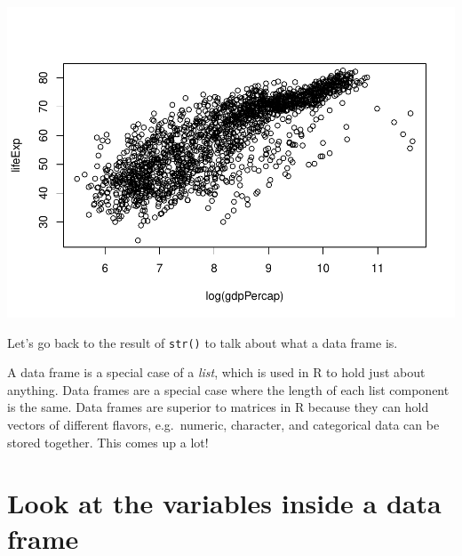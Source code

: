 \documentclass[
]{book}
\newenvironment{Shaded}{\begin{snugshade}}{\end{snugshade}}
\newcommand{\CommentTok}[1]{\textcolor[rgb]{0.56,0.35,0.01}{\textit{#1}}}
\newcommand{\KeywordTok}[1]{\textcolor[rgb]{0.13,0.29,0.53}{\textbf{#1}}}
\newcommand{\NormalTok}[1]{#1}
\begin{document}
\includegraphics{05_data-care-feeding_files/figure-latex/first-plots-base-R-3.pdf}

Let's go back to the result of \texttt{str()} to talk about what a data frame is.

\begin{Shaded}
\end{Shaded}

A data frame is a special case of a \emph{list}, which is used in R to hold just about anything. Data frames are a special case where the length of each list component is the same. Data frames are superior to matrices in R because they can hold vectors of different flavors, e.g.~numeric, character, and categorical data can be stored together. This comes up a lot!

\hypertarget{look-at-the-variables-inside-a-data-frame}{%
\section{Look at the variables inside a data frame}\label{look-at-the-variables-inside-a-data-frame}}
\end{document}
